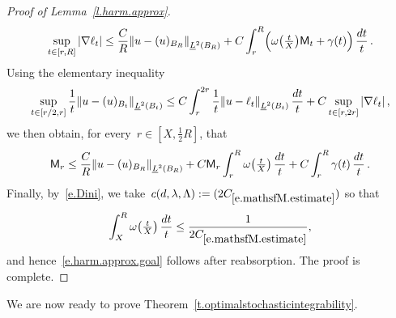 \documentclass[11pt,twoside]{article} %
\numberwithin{equation}{section}
\theoremstyle{definition}
\let\originalleft\left
\let\originalright\right
\renewcommand{\left}{\mathopen{}\mathclose\bgroup\originalleft}
\renewcommand{\right}{\aftergroup\egroup\originalright}
\begin{document}
\begin{proof}[{Proof of Lemma~\ref{l.harm.approx}}]
\begin{equation*}  
\sup_{t \in [r,R]} |\nabla \ell_{t}| 
\leq 
\frac CR \left\| u- (u)_{B_R} \right\|_{\underline{L}^2 \left( B_{R} \right)}   
+ C \int_{ r}^{R}  \Bigl(  \omega\bigl( \tfrac{t}X \bigr) \mathsf{M}_t  + \gamma(t) \Bigr)  \, \frac{dt}{t}
\,.
\end{equation*}
Using the elementary inequality
\begin{equation*}  
\sup_{t \in [r/2,r] } \frac1{t} \left\| u - (u)_{B_t} \right\|_{\underline{L}^2 \left( B_{ t} \right)} 
\leq C \int_{r}^{2r} \frac1{t} \left\| u - \ell_{t} \right\|_{\underline{L}^2 \left( B_{ t} \right)} \, \frac{dt}{t} 
+ C \sup_{t \in [r,2r]} |\nabla \ell_{t}|  
\,,
\end{equation*}
we then obtain, for every~$r \in [X,\tfrac12 R]$, that 
\begin{equation}  
\label{e.mathsfM.estimate}
\mathsf{M}_r  \leq \frac CR \left\| u- (u)_{B_R} \right\|_{\underline{L}^2 \left( B_{R} \right)}   
+ C \mathsf{M}_r  \int_{ r}^{R}  \omega\bigl( \tfrac{t}X \bigr)  \, \frac{dt}{t}  + C \int_{ r}^{R}  \gamma(t)  \, \frac{dt}{t} 
\,.
\end{equation}
Finally, by~\eqref{e.Dini}, we take~$c(d,\lambda,\Lambda) := (2C_{\eqref{e.mathsfM.estimate}})$ so that
\begin{equation*}  
\int_{X}^{R}  \omega\bigl( \tfrac{t}X \bigr)  \, \frac{dt}{t} \leq \frac1{2C_{\eqref{e.mathsfM.estimate}}},
\end{equation*}
and hence~\eqref{e.harm.approx.goal} follows after reabsorption. The proof is complete. 
\end{proof}

We are now ready to prove Theorem~\ref{t.optimalstochasticintegrability}. 
\end{document}
